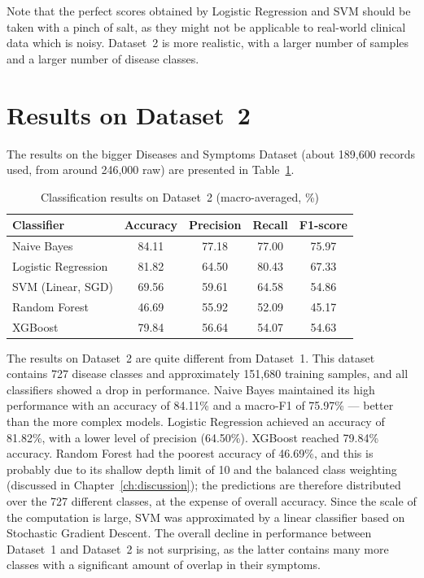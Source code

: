 Note that the perfect scores obtained by Logistic Regression and SVM should be taken with a pinch of salt, as they might not be applicable to real-world clinical data which is noisy. Dataset~2 is more realistic, with a larger number of samples and a larger number of disease classes.

\section{Results on Dataset~2}
\label{sec:results_dataset2}

The results on the bigger Diseases and Symptoms Dataset (about 189,600 records used, from around 246,000 raw) are presented in Table~\ref{tab:results_dataset2}.

\begin{table}[H]
\centering
\caption{Classification results on Dataset~2 (macro-averaged, \%)}
\label{tab:results_dataset2}
\begin{tabular}{@{}lcccc@{}}
\toprule
\textbf{Classifier} & \textbf{Accuracy} & \textbf{Precision} & \textbf{Recall} & \textbf{F1-score} \\
\midrule
Naive Bayes          & 84.11 & 77.18 & 77.00 & 75.97 \\
Logistic Regression  & 81.82 & 64.50 & 80.43 & 67.33 \\
SVM (Linear, SGD)    & 69.56 & 59.61 & 64.58 & 54.86 \\
Random Forest        & 46.69 & 55.92 & 52.09 & 45.17 \\
XGBoost              & 79.84 & 56.64 & 54.07 & 54.63 \\
\bottomrule
\end{tabular}
\end{table}

The results on Dataset~2 are quite different from Dataset~1. This dataset contains 727 disease classes and approximately 151{,}680 training samples, and all classifiers showed a drop in performance. Naive Bayes maintained its high performance with an accuracy of 84.11\% and a macro-F1 of 75.97\% --- better than the more complex models. Logistic Regression achieved an accuracy of 81.82\%, with a lower level of precision (64.50\%). XGBoost reached 79.84\% accuracy. Random Forest had the poorest accuracy of 46.69\%, and this is probably due to its shallow depth limit of 10 and the balanced class weighting (discussed in Chapter~\ref{ch:discussion}); the predictions are therefore distributed over the 727 different classes, at the expense of overall accuracy. Since the scale of the computation is large, SVM was approximated by a linear classifier based on Stochastic Gradient Descent. The overall decline in performance between Dataset~1 and Dataset~2 is not surprising, as the latter contains many more classes with a significant amount of overlap in their symptoms.

